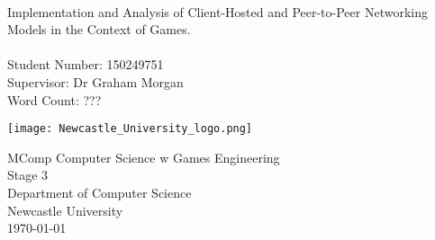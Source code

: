 \begin{titlepage}
  \begin{center}
    \makeatletter
    \vspace*{1cm}
    \Huge
    \textbf{\@title}\\
    \vspace*{0.5cm}
    \large
    Implementation and Analysis of Client-Hosted and Peer-to-Peer Networking Models in the Context of Games.\\


    \vspace*{2cm}
    \Large
    \textbf{\@author}\\
    \large
    Student Number: 150249751\\
    Supervisor: Dr Graham Morgan\\

    \vspace*{2cm}
    Word Count: ???\\

    \vfill

    \texttt{[image: Newcastle\_University\_logo.png]}

    \Large
    MComp Computer Science w Games Engineering\\
    Stage 3\\
    \vspace*{1cm}
    Department of Computer Science\\
    Newcastle University\\
    \today
    \makeatother
  \end{center}
\end{titlepage}
